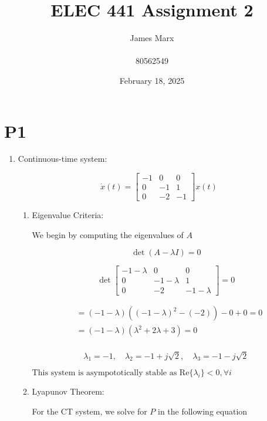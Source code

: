 \documentclass{article}
\title{ELEC 441 Assignment 2}
\author{James Marx \\ \\ 80562549}
\date{February 18, 2025}
\begin{document}
\maketitle
\newpage

\newpage

\section*{P1}

\begin{enumerate}[label=\alph*)]
    \item Continuous-time system:

    \[
     \dot x(t) = 
    \begin{bmatrix}
        -1 & 0 & 0 \\
        0 & -1 & 1 \\
        0 & -2 & -1
    \end{bmatrix}
    x(t)
    \]

    \begin{enumerate}[label=\roman*)]
        \item Eigenvalue Criteria:

        We begin by computing the eigenvalues of $A$

        \[ \det(A - \lambda I) = 0\]

        \[
            \det \begin{bmatrix}
                -1 - \lambda & 0 & 0 \\
                0 & -1 - \lambda & 1 \\
                0 & -2 & -1 - \lambda
            \end{bmatrix} 
            = 0
        \]

        \begin{align*}
            &= (-1- \lambda)\left((-1 - \lambda)^2 - (-2)\right) - 0 + 0 = 0 \\
            &= (-1 - \lambda)(\lambda^2 + 2\lambda + 3) = 0 \\
        \end{align*}

        \[\lambda_1 = -1, \quad \lambda_2 = -1 + j\sqrt{2}, \quad \lambda_3 = -1 - j\sqrt{2}\]

        $\boxed{\text{This system is asympototically stable as $\text{Re}\{\lambda_i\} < 0, \forall i$}}$

        \item Lyapunov Theorem:

        For the CT system, we solve for $P$ in the following equation


\end{enumerate}
\end{enumerate}
\end{document}
